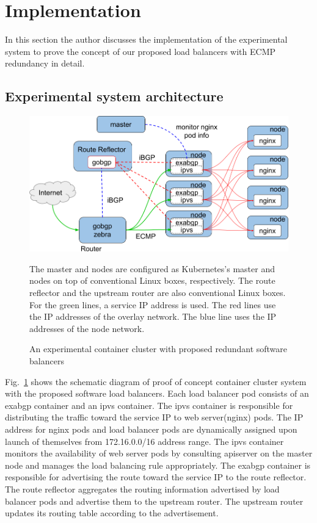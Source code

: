 \section{Implementation}

In this section the author discusses the implementation of the experimental system to prove the concept of our proposed load balancers with ECMP redundancy in detail.

\subsection{Experimental system architecture}\label{sec:poc}

\begin{figure}[tb]
\begin{center}
\includegraphics[width=0.8\columnwidth]{Figs/poc.png}
\end{center}
\caption{An experimental container cluster with proposed redundant software balancers}
\centering\parbox[c]{0.9\columnwidth}{
  The master and nodes are configured as Kubernetes's master and nodes on top of conventional Linux boxes, respectively.
  The route reflector and the upstream router are also conventional Linux boxes.
  For the green lines, a service IP address is used. The red lines use the IP addresses of the overlay network. The blue line uses the IP addresses of the node network.
}

\label{fig:poc}
\end{figure}

Fig.~\ref{fig:poc} shows the schematic diagram of proof of concept container cluster system with the proposed software load balancers.
%
Each load balancer pod consists of an exabgp container and an ipvs container.
The ipvs container is responsible for distributing the traffic toward the service IP to web server(nginx) pods.
The IP address for nginx pods and load balancer pods are dynamically assigned upon launch of themselves from 172.16.0.0/16 address range.
The ipvs container monitors the availability of web server pods by consulting apiserver on the master node and manages the load balancing rule appropriately.
The exabgp container is responsible for advertising the route toward the service IP to the route reflector.
The route reflector aggregates the routing information advertised by load balancer pods and advertise them to the upstream router.
The upstream router updates its routing table according to the advertisement.

